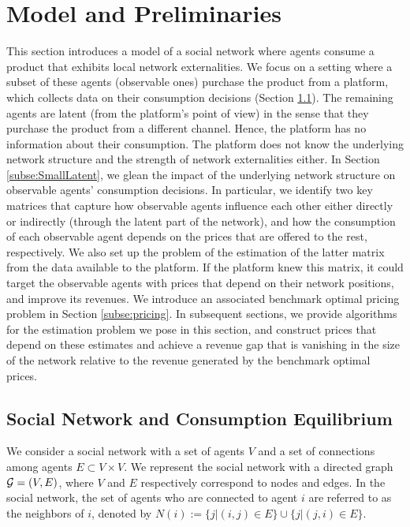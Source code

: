 \documentclass[opre,nonblindrev]{informs3} %
\begin{document}
\section{Model and Preliminaries}\label{se:model}
This section introduces a model of a social network where agents consume a product that exhibits local network externalities.
We  focus on a setting where a subset of these agents (observable ones)
purchase the product from a platform, which collects data on  their
consumption decisions (Section \ref{subse:networkModel}).
The remaining agents are latent (from the platform's point of view) in the sense that they purchase the product from a different channel. Hence,
the platform has no information about their consumption.
The platform  does not know the underlying network structure and the strength of network externalities either.
In Section \ref{subse:SmallLatent},
we glean the
impact of the underlying network structure on
observable agents' consumption decisions.  In particular,
we identify two key matrices that  capture
how observable agents influence each other either directly or indirectly (through the latent part of the network), and
how the consumption of each observable agent depends on the prices that are offered to the rest, respectively.
We also set up the problem of the estimation of the latter matrix from the data available to the platform.
If the platform knew this matrix, it could
target the observable agents with prices that depend on their network positions,
and improve its revenues.
We introduce an associated benchmark optimal pricing problem
 in Section \ref{subse:pricing}.
In subsequent sections,
we provide algorithms for the estimation problem we pose in this section, and construct prices that depend on these estimates
and achieve a revenue gap that is vanishing
in the size of the network
 relative to the revenue generated by the benchmark optimal prices.
 


\subsection{Social Network and Consumption Equilibrium} \label{subse:networkModel}
We consider a social network  with a set of agents  $V$ and a set of connections among agents  $E\subset V\times V$.
We represent the social network with a directed graph
${\cal G}=(V, E)$, where $V$ and $E$ respectively correspond to nodes and edges.
In the social network, the set of agents who are connected to agent $i$ are referred to as the neighbors of $i$, denoted by $N(i):=\{j|(i,j)\in E\} \cup \{j | (j,i)\in E \}$.
\end{document}

